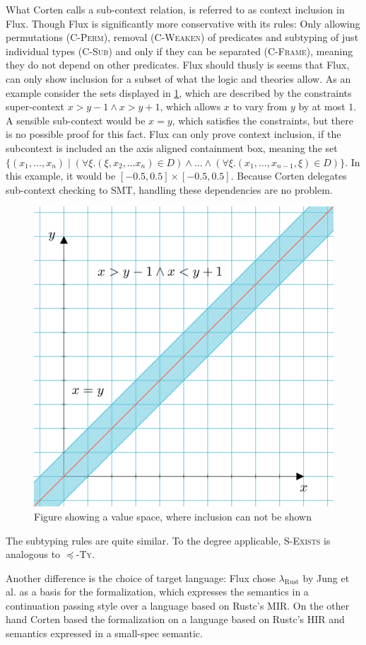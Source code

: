 \documentclass[twoside, english]{sdqthesis}
\theoremstyle{definition}
\begin{document}
What Corten calls a sub-context relation, is referred to as context inclusion in Flux.
Though Flux is significantly more conservative with its rules: Only allowing permutations (\textsc{C-Perm}), removal (\textsc{C-Weaken}) of predicates and subtyping of just individual types (\textsc{C-Sub}) and only if they can be separated (\textsc{C-Frame}), meaning they do not depend on other predicates.
Flux should thusly is seems that Flux, can only show inclusion for a subset of what the logic and theories allow.
As an example consider the sets displayed in \cref{fig:flux-context-space}, which are described by the constraints super-context $x > y - 1 \wedge x > y + 1$, which allows $x$ to vary from $y$ by at most $1$. A sensible sub-context would be $x=y$, which satisfies the constraints, but there is no possible proof for this fact. Flux can only prove context inclusion, if the subcontext is included an the axis aligned containment box, meaning the set $\{(x_1, \dots, x_n) \mid (\forall \xi. (\xi, x_2, \dots x_n) \in D) \wedge \dots \wedge (\forall \xi. (x_1, \dots, x_{n-1}, \xi) \in D)\}$. In this example, it would be $[-0.5, 0.5] \times [-0.5, 0.5]$. 
Because Corten delegates sub-context checking to SMT, handling these dependencies are no problem.

\begin{figure}[h]
	\centering
	\includegraphics[width=0.5\linewidth]{../context-space.png}
	\caption{Figure showing a value space, where inclusion can not be shown}
	\label{fig:flux-context-space}
\end{figure}

The subtyping rules are quite similar. To the degree applicable, \textsc{S-Exists} is analogous to \textsc{$\preceq$-Ty}.

Another difference is the choice of target language: Flux chose $\lambda_{\text{Rust}}$ by Jung et al. \cite{jung_rustbelt_2018} as a basis for the formalization, which expresses the semantics in a continuation passing style over a language based on Rustc's MIR. 
On the other hand Corten based the formalization on a language based on Rustc's HIR and semantics expressed in a small-spec semantic. 
\end{document}
